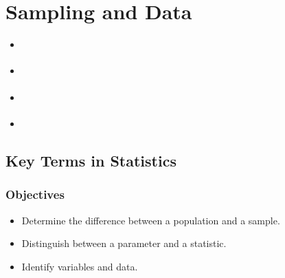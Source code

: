 \documentclass[letterpaper,10pt,english]{jupyterBook}
\begin{document}
\chapter{Sampling and Data}
\label{\detokenize{Ch1 Sampling and Data/1.0 Sampling and Data:sampling-and-data}}\label{\detokenize{Ch1 Sampling and Data/1.0 Sampling and Data::doc}}\begin{itemize}
\item {} 
\sphinxAtStartPar
{\hyperref[\detokenize{Ch1 Sampling and Data/1.1 Key Terms in Statistics::doc}]{}}

\item {} 
\sphinxAtStartPar
{\hyperref[\detokenize{Ch1 Sampling and Data/1.2 Scales of Measurement::doc}]{}}

\item {} 
\sphinxAtStartPar
{\hyperref[\detokenize{Ch1 Sampling and Data/1.3 Sampling Techniques::doc}]{}}

\item {} 
\sphinxAtStartPar
{\hyperref[\detokenize{Ch1 Sampling and Data/1.4 Tables and Charts::doc}]{}}

\end{itemize}

\sphinxstepscope


\section{Key Terms in Statistics}
\label{\detokenize{Ch1 Sampling and Data/1.1 Key Terms in Statistics:key-terms-in-statistics}}\label{\detokenize{Ch1 Sampling and Data/1.1 Key Terms in Statistics::doc}}

\subsection{Objectives}
\label{\detokenize{Ch1 Sampling and Data/1.1 Key Terms in Statistics:objectives}}\begin{itemize}
\item {} 
\sphinxAtStartPar
Determine the difference between a population and a sample.

\item {} 
\sphinxAtStartPar
Distinguish between a parameter and a statistic.

\item {} 
\sphinxAtStartPar
Identify variables and data.

\end{itemize}
\end{document}
